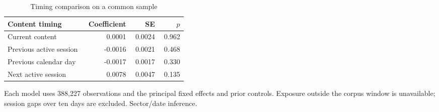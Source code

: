 \begin{table}[htbp]
\centering
\caption{Timing comparison on a common sample}
\label{tab:timing}
\begin{minipage}{\linewidth}
\small
\setlength{\tabcolsep}{4pt}
\begingroup\centering
\begin{tabular}{p{0.43\linewidth}rrr}
\toprule
Content timing & Coefficient & SE & $p$ \\
\midrule
Current content & 0.0001 & 0.0024 & 0.962 \\
Previous active session & -0.0016 & 0.0021 & 0.468 \\
Previous calendar day & -0.0017 & 0.0017 & 0.330 \\
Next active session & 0.0078 & 0.0047 & 0.135 \\
\bottomrule
\end{tabular}\par\endgroup
\par\vspace{0.5em}\footnotesize Each model uses 388,227 observations and the principal fixed effects and prior controls. Exposure outside the corpus window is unavailable; session gaps over ten days are excluded. Sector/date inference.
\end{minipage}
\end{table}

